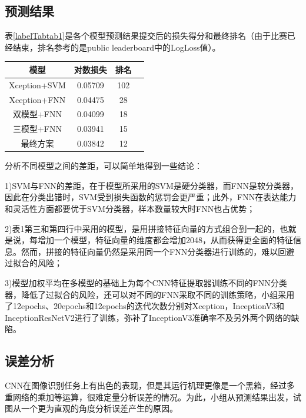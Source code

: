 \documentclass[10.5pt,twocolumn]{jbuaa}
\begin{document}
\subsection{预测结果}
表\ref{labelTabtab1}是各个模型预测结果提交后的损失得分和最终排名（由于比赛已经结束，排名参考的是public leaderboard中的LogLoss值）。
\begin{table}[h]
\centering
\captionnamefont{\xiaowuhao\bf }
\captiontitlefont{\xiaowuhao\bf }
\renewcommand\tabcolsep{1em}
\begin{tabular}{cccc}
\toprule
{模型} &  {对数损失} & {排名}\\
\midrule
Xception+SVM & 0.05709 & 102\\
Xception+FNN & 0.04475 & 28\\
双模型+FNN & 0.04099 & 18\\
三模型+FNN & 0.03941 & 15\\
最终方案 & 0.03842 & 12\\
\bottomrule
\end{tabular}
\end{table}
分析不同模型之间的差距，可以简单地得到一些结论：

1)SVM与FNN的差距，在于模型所采用的SVM是硬分类器，而FNN是软分类器，因此在分类出错时，SVM受到损失函数的惩罚会更严重；此外，FNN在表达能力和灵活性方面都要优于SVM分类器，样本数量较大时FNN也占优势；

2)表1第三和第四行中采用的模型，是用拼接特征向量的方式组合到一起的，也就是说，每增加一个模型，特征向量的维度都会增加2048，从而获得更全面的特征信息。然而，拼接的特征向量仍然是采用同一个FNN分类器进行训练的，难以回避过拟合的风险；

3)模型加权平均在多模型的基础上为每个CNN特征提取器训练不同的FNN分类器，降低了过拟合的风险，还可以对不同的FNN采取不同的训练策略，小组采用了12epochs、20epochs和12epochs的迭代次数分别对Xception，InceptionV3和InceptionResNetV2进行了训练，弥补了InceptionV3准确率不及另外两个网络的缺陷。
\subsection{误差分析}
CNN在图像识别任务上有出色的表现，但是其运行机理更像是一个黑箱，经过多重网络的乘加等运算，很难定量分析误差的情况。为此，小组从预测结果出发，试图从一个更为直观的角度分析误差产生的原因。
\end{document}
